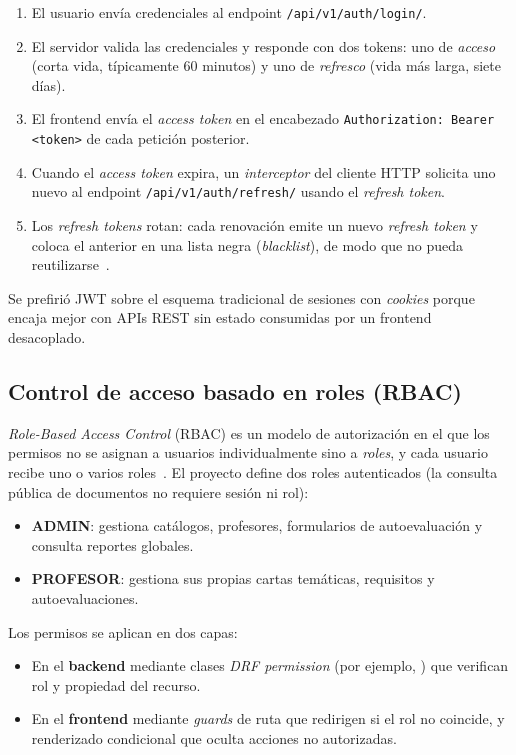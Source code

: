 \begin{enumerate}
    \item El usuario envía credenciales al endpoint \texttt{/api/v1/auth/login/}.
    \item El servidor valida las credenciales y responde con dos tokens: uno de \emph{acceso} (corta vida, típicamente 60 minutos) y uno de \emph{refresco} (vida más larga, siete días).
    \item El frontend envía el \emph{access token} en el encabezado \texttt{Authorization: Bearer <token>} de cada petición posterior.
    \item Cuando el \emph{access token} expira, un \emph{interceptor} del cliente HTTP solicita uno nuevo al endpoint \texttt{/api/v1/auth/refresh/} usando el \emph{refresh token}.
    \item Los \emph{refresh tokens} rotan: cada renovación emite un nuevo \emph{refresh token} y coloca el anterior en una lista negra (\emph{blacklist}), de modo que no pueda reutilizarse~\cite{simplejwt2024}.
\end{enumerate}

Se prefirió JWT sobre el esquema tradicional de sesiones con \emph{cookies} porque encaja mejor con APIs REST sin estado consumidas por un frontend desacoplado.

\subsection{Control de acceso basado en roles (RBAC)}

\emph{Role-Based Access Control} (RBAC) es un modelo de autorización en el que los permisos no se asignan a usuarios individualmente sino a \emph{roles}, y cada usuario recibe uno o varios roles~\cite{sandhu1996rbac}. El proyecto define dos roles autenticados (la consulta pública de documentos no requiere sesión ni rol):

\begin{itemize}
    \item \textbf{ADMIN}: gestiona catálogos, profesores, formularios de autoevaluación y consulta reportes globales.
    \item \textbf{PROFESOR}: gestiona sus propias cartas temáticas, requisitos y autoevaluaciones.
\end{itemize}

Los permisos se aplican en dos capas:

\begin{itemize}
    \item En el \textbf{backend} mediante clases \emph{DRF permission} (por ejemplo, ) que verifican rol y propiedad del recurso.
    \item En el \textbf{frontend} mediante \emph{guards} de ruta que redirigen si el rol no coincide, y renderizado condicional que oculta acciones no autorizadas.
\end{itemize}

